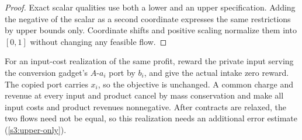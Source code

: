 \begin{proof}
Exact scalar qualities use both a lower and an upper specification.
Adding the negative of the scalar as a second coordinate expresses the
same restrictions by upper bounds only. Coordinate shifts and positive
scaling normalize them into $[0,1]$ without changing any feasible flow.
\end{proof}

For an input-cost realization of the same profit, reward the private
input serving the conversion gadget's $A$-$a_i$ port by $b_i$, and give
the actual intake zero reward. The copied port carries $x_i$, so the
objective is unchanged. A common charge and revenue at every input and
product cancel by mass conservation and make all input costs and product
revenues nonnegative. After contracts are relaxed, the two flows need
not be equal, so this realization needs an additional error estimate
(\cref{s3:upper-only}).

